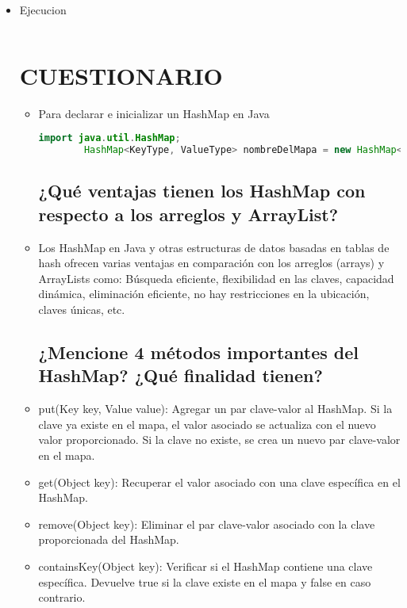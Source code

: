 \documentclass{article}
\begin{document}
\begin{itemize}
\begin{itemize}
         \item Ejecucion
         \begin{lstlisting}[language=java]

         \end{lstlisting}
 
    \section{CUESTIONARIO}

	\begin{itemize}
	\subsection {¿Cómo se declara e inicializa un HashMap?}
        \item Para declarar e inicializar un HashMap en Java
        \begin{lstlisting}[language=java]
        import java.util.HashMap;
        HashMap<KeyType, ValueType> nombreDelMapa = new HashMap<>();
        \end{lstlisting}
		
    \subsection {¿Qué ventajas tienen los HashMap con respecto a los arreglos y ArrayList?}
        \item Los HashMap en Java y otras estructuras de datos basadas en tablas de hash ofrecen varias ventajas en comparación con los arreglos (arrays) y ArrayLists como: Búsqueda eficiente, flexibilidad en las claves, capacidad dinámica, eliminación eficiente, no hay restricciones en la ubicación, claves únicas, etc.

	\subsection {¿Mencione 4 métodos importantes del HashMap? ¿Qué finalidad tienen?}
        \item put(Key key, Value value): Agregar un par clave-valor al HashMap. Si la clave ya existe en el mapa, el valor asociado se actualiza con el nuevo valor proporcionado. Si la clave no existe, se crea un nuevo par clave-valor en el mapa.
        \item get(Object key): Recuperar el valor asociado con una clave específica en el HashMap.
        \item remove(Object key): Eliminar el par clave-valor asociado con la clave proporcionada del HashMap.
        \item containsKey(Object key): Verificar si el HashMap contiene una clave específica. Devuelve true si la clave existe en el mapa y false en caso contrario.
	\end{itemize}
	

\end{itemize}
\end{itemize}
\end{document}
